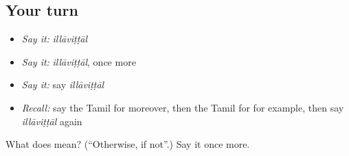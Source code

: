 \subsection*{Your turn}
\begin{itemize}
\raggedright
  \item \emph{Say it:} \emph{illāviṭṭāl}
  \item \emph{Say it:} \emph{illāviṭṭāl}, once more
  \item \emph{Say it:} say \emph{illāviṭṭāl}
  \item \emph{Recall:} say the Tamil for moreover, then the Tamil for for example, then say \emph{illāviṭṭāl} again
\end{itemize}

\begin{tcolorbox}[breakable,colback=teal!4,colframe=teal!35!black,title={Before you move on}]
What does  mean? (\textquotedblleft{}Otherwise, if not\textquotedblright{}.) Say it once more.
\end{tcolorbox}
